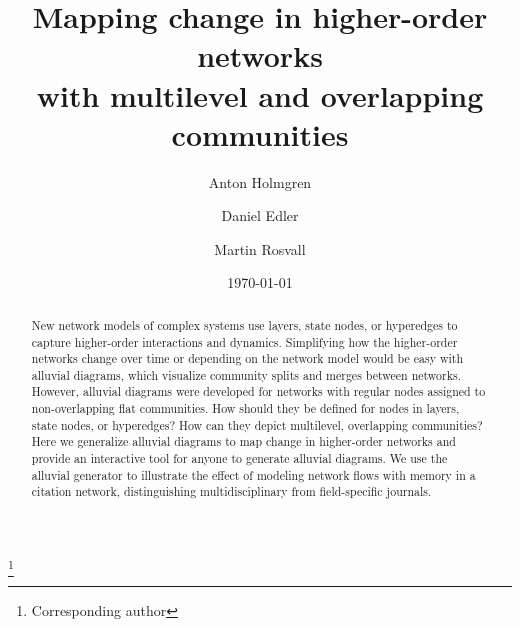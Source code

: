 \documentclass[aps,rmp,floats,floatfix,twocolumn,superscriptaddress,final]{revtex4-2}
\begin{document}
\title{Mapping change in higher-order networks\\ with multilevel and overlapping communities}

\author{Anton Holmgren }
\thanks{Corresponding author}

\author{Daniel Edler }

\author{Martin Rosvall }


\date{\today}

\begin{abstract}
New network models of complex systems use layers, state nodes, or hyperedges to capture higher-order interactions and dynamics.
Simplifying how the higher-order networks change over time or depending on the network model would be easy with alluvial diagrams, which visualize community splits and merges between networks.
However, alluvial diagrams were developed for networks with regular nodes assigned to non-overlapping flat communities.
How should they be defined for nodes in layers, state nodes, or hyperedges?
How can they depict multilevel, overlapping communities?
Here we generalize alluvial diagrams to map change in higher-order networks and provide an interactive tool for anyone to generate alluvial diagrams.
We use the alluvial generator to illustrate the effect of modeling network flows with memory in a citation network, distinguishing multidisciplinary from field-specific journals.
\end{abstract}

\maketitle
\end{document}
